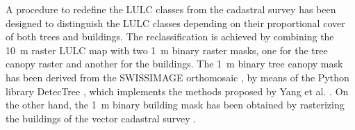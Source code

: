 \documentclass[12pt]{iopart}
\begin{document}
A procedure to redefine the LULC classes from the cadastral survey has been designed to distinguish the LULC classes depending on their proportional cover of both trees and buildings. The reclassification is achieved by combining the 10~m raster LULC map with two 1~m binary raster masks, one for the tree canopy raster and another for the buildings. %
The 1~m binary tree canopy mask has been derived from the SWISSIMAGE orthomosaic \cite{swisstopo2019swissimage}, by means of the Python library DetecTree \cite{bosch2020detectree}, which implements the methods proposed by Yang et al. \cite{yang2009tree}. On the other hand, the 1~m binary building mask has been obtained by rasterizing the buildings of the vector cadastral survey \cite{asitvd2018structure}.
\end{document}
